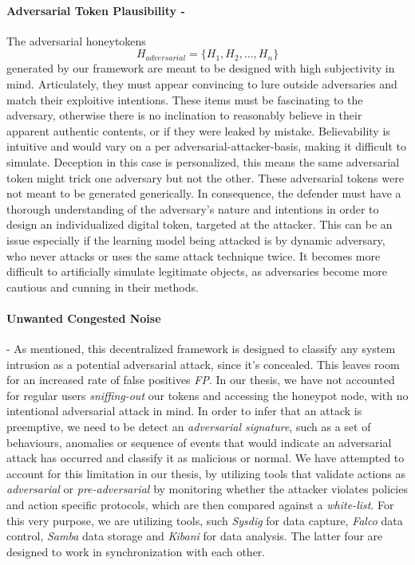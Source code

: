 \documentclass[grad,lot,lof,11pt,oneside,onehalfspace]{RUthesis}
\begin{document}
\paragraph{Adversarial Token Plausibility -}
The adversarial honeytokens 
\begin{equation*}
H_{adversarial}=\{H_{1},H_{2},...,H_{n}\}
\end{equation*}
generated by our framework are meant to be designed with high subjectivity in mind. Articulately, they must appear convincing to lure outside adversaries and match their exploitive intentions. These items must be fascinating to the adversary, otherwise there is no inclination to reasonably believe in their apparent authentic contents, or if they were leaked by mistake. Believability is intuitive and would vary on a per adversarial-attacker-basis, making it difficult to simulate. Deception in this case is personalized, this means the same adversarial token might trick one adversary but not the other. These adversarial tokens were not meant to be generated generically. In consequence, the defender must have a thorough understanding of the adversary's nature and intentions in order to design an individualized digital token, targeted at the attacker. This can be an issue especially if the learning model being attacked is by dynamic adversary, who never attacks or uses the same attack technique twice. It becomes more difficult to artificially simulate legitimate objects, as adversaries become more cautious and cunning in their methods.  
\paragraph{Unwanted Congested Noise} - As mentioned, this decentralized framework is designed to classify any system intrusion as a potential adversarial attack, since it's concealed. This leaves room for an increased rate of false positives \textit{FP}. In our thesis, we have not accounted for regular users \textit{sniffing-out} our tokens and accessing the honeypot node, with no intentional adversarial attack in mind. In order to infer that an attack is preemptive, we need to be detect an \textit{adversarial signature}, such as a set of behaviours, anomalies or sequence of events that would indicate an adversarial attack has occurred and classify it as malicious or normal. We have attempted to account for this limitation in our thesis, by utilizing tools that validate actions as \textit{adversarial} or \textit{pre-adversarial} by monitoring whether the attacker violates policies and action specific protocols, which are then compared against a \textit{white-list}. For this very purpose, we are utilizing tools, such \textit{Sysdig} for data capture, \textit{Falco} data control, \textit{Samba} data storage and \textit{Kibani} for data analysis. The latter four are designed to work in synchronization with each other.    
\end{document}
